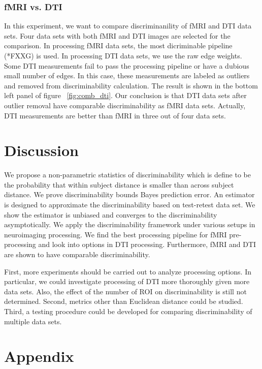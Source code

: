 \documentclass{article}
\begin{document}
\subsubsection{fMRI vs. DTI}
In this experiment, we want to compare discriminanility of fMRI and DTI data sets. Four data sets with both fMRI and DTI images are selected for the comparison. In processing fMRI data sets, the most dicriminable pipeline (*FXXG) is used. In processing DTI data sets, we use the raw edge weights. Some DTI measurements fail to pass the processing pipeline or have a dubious small number of edges. In this case, these measurements are labeled as outliers and removed from discriminability calculation. The result is shown in the bottom left panel of figure ~\ref{fig:comb_dti}. Our conclusion is that DTI data sets after outlier removal have comparable discriminability as fMRI data sets. Actually, DTI measurements are better than fMRI in three out of four data sets. 



\section{Discussion}

 We propose a non-parametric statistics of discriminability which is define to be the probability that within subject distance is smaller than across subject distance.  We prove discriminability bounds Bayes prediction error. An estimator is designed to approximate the discriminability based on test-retest data set. We show the estimator is unbiased and converges to the discriminability asymptotically. We apply the discriminability framework under various setups in neuroimaging processing. We find the best processing pipeline for fMRI pre-processing and look into options in DTI processing. Furthermore, fMRI and DTI are shown to have comparable discriminability.



 First, more experiments should be carried out to analyze processing options. In particular, we could investigate processing of DTI more thoroughly given more data sets. Also, the effect of the number of ROI on discriminability is still not determined. Second, metrics other than Euclidean distance could be studied. Third, a testing procedure could be developed for comparing discriminability of multiple data sets.



\section{Appendix}
\end{document}
